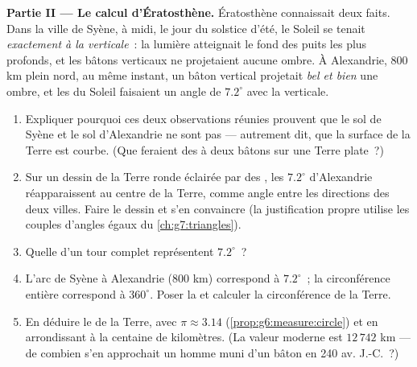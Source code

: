 \begin{problem}
\medskip
\noindent\textbf{Partie II --- Le calcul d'Ératosthène.}
Ératosthène connaissait deux faits. Dans la ville de Syène, à midi,
le jour du solstice d'été, le Soleil se tenait \emph{exactement à la
verticale}~: la lumière atteignait le fond des puits les plus
profonds, et les bâtons verticaux ne projetaient aucune ombre. À
Alexandrie, $800$ km plein nord, au même instant, un bâton vertical
projetait \emph{bel et bien} une ombre, et les  du Soleil
faisaient un angle de $7.2^\circ$ avec la verticale.
\begin{enumerate}[resume]
  \item Expliquer pourquoi ces deux observations réunies prouvent que
        le sol de Syène et le sol d'Alexandrie ne sont pas 
        --- autrement dit, que la surface de la Terre est courbe.
        (Que feraient des   à deux bâtons sur une
        Terre plate~?)
  \item Sur un dessin de la Terre ronde éclairée par des 
        , les $7.2^\circ$ d'Alexandrie réapparaissent au
        centre de la Terre, comme angle entre les directions des deux
        villes. Faire le dessin et s'en convaincre (la justification
        propre utilise les couples d'angles égaux du
        \cref{ch:g7:triangles}).
  \item Quelle  d'un tour complet représentent $7.2^\circ$~?
  \item L'arc de Syène à Alexandrie ($800$ km) correspond à
        $7.2^\circ$~; la circonférence entière correspond à
        $360^\circ$. Poser la  et calculer la
        circonférence de la Terre.
  \item En déduire le  de la Terre, avec
        $\pi \approx 3.14$ (\cref{prop:g6:measure:circle}) et en
        arrondissant à la centaine de kilomètres. (La valeur moderne
        est $12\,742$ km --- de combien s'en approchait un homme
        muni d'un bâton en 240 av. J.-C.~?)
\end{enumerate}


\end{problem}
